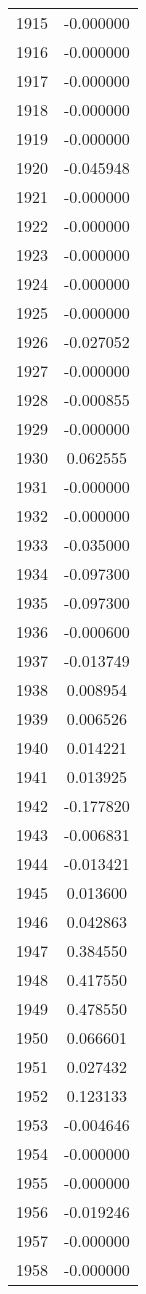 \documentclass[12pt]{article}
\begin{document}
\begin{longtable}{@{}cc@{}}
1915 & -0.000000 \\
1916 & -0.000000 \\
1917 & -0.000000 \\
1918 & -0.000000 \\
1919 & -0.000000 \\
1920 & -0.045948 \\
1921 & -0.000000 \\
1922 & -0.000000 \\
1923 & -0.000000 \\
1924 & -0.000000 \\
1925 & -0.000000 \\
1926 & -0.027052 \\
1927 & -0.000000 \\
1928 & -0.000855 \\
1929 & -0.000000 \\
1930 & 0.062555 \\
1931 & -0.000000 \\
1932 & -0.000000 \\
1933 & -0.035000 \\
1934 & -0.097300 \\
1935 & -0.097300 \\
1936 & -0.000600 \\
1937 & -0.013749 \\
1938 & 0.008954 \\
1939 & 0.006526 \\
1940 & 0.014221 \\
1941 & 0.013925 \\
1942 & -0.177820 \\
1943 & -0.006831 \\
1944 & -0.013421 \\
1945 & 0.013600 \\
1946 & 0.042863 \\
1947 & 0.384550 \\
1948 & 0.417550 \\
1949 & 0.478550 \\
1950 & 0.066601 \\
1951 & 0.027432 \\
1952 & 0.123133 \\
1953 & -0.004646 \\
1954 & -0.000000 \\
1955 & -0.000000 \\
1956 & -0.019246 \\
1957 & -0.000000 \\
1958 & -0.000000 \\

\end{longtable}
\end{document}
